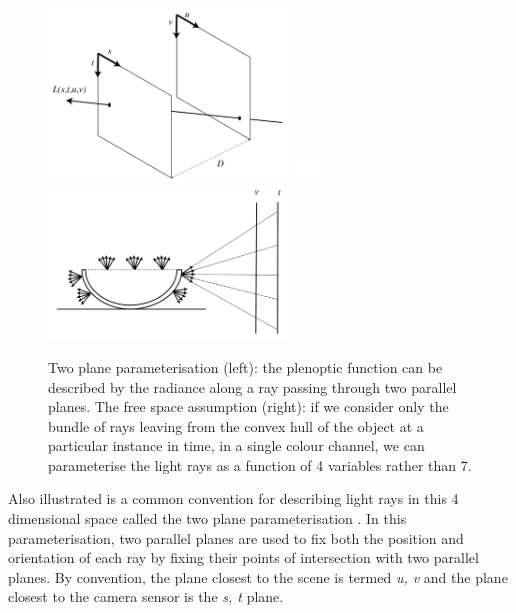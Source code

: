 \documentclass[openany]{book}
\begin{document}
\begin{figure}[htbp]
    \centering
    \includegraphics[width=2.5in]{images/2pp.png}
    \label{convexhull}
    \includegraphics[width=0.3in]{images/blank.png}
    \includegraphics[width=2.5in]{images/convexhull.png}
    
    \caption{Two plane parameterisation (left): the plenoptic function can be described by the radiance along a ray passing through two parallel planes. The free space assumption (right): if we consider only the bundle of rays leaving from the convex hull of the object at a particular instance in time, in a single colour channel, we can parameterise the light rays as a function of 4 variables rather than 7.}
    
    
\end{figure}

Also illustrated is a common convention for describing light rays in this 4 dimensional space called the two plane parameterisation \cite{gortler1996lumigraph}. In this parameterisation, two parallel planes are used to fix both the position and orientation of each ray by fixing their points of intersection with two parallel planes. By convention, the plane closest to the scene is termed \textit{u, v} and the plane closest to the camera sensor is the \textit{s, t} plane.
\end{document}
